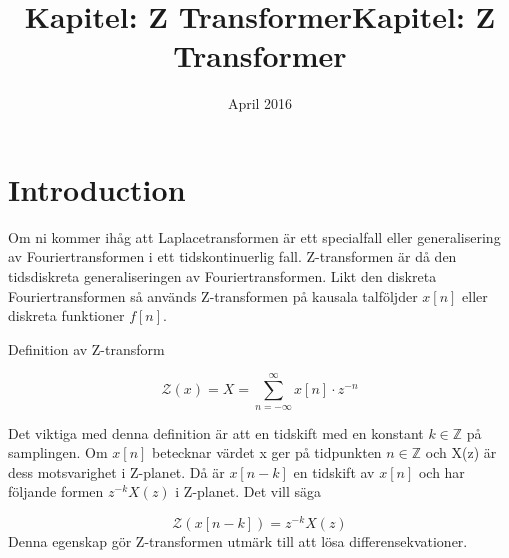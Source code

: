 \documentclass{article}
\title{Kapitel: Z Transformer}
\author{ }
\date{April 2016}
\title{Kapitel: Z Transformer}
\begin{document}
\maketitle

\section{Introduction}

Om ni kommer ihåg att Laplacetransformen är ett specialfall eller generalisering av Fouriertransformen i ett
tidskontinuerlig fall. Z-transformen är då den tidsdiskreta generaliseringen av Fouriertransformen.
Likt den diskreta Fouriertransformen så används Z-transformen på kausala talföljder $x[n]$ eller
diskreta funktioner $f[n]$. %

Definition av Z-transform

$$\mathcal{Z}(x) = X = \sum_{n=-\infty}^{\infty} x[n] \cdot z^{-n} $$

Det viktiga med denna definition är att en tidskift med en konstant $k \in \mathbb{Z}$ på samplingen. Om $x[n]$ betecknar värdet x ger på tidpunkten $n \in \mathbb{Z}$ och X(z) är dess motsvarighet i Z-planet. Då är $x[n-k]$ en tidskift av $x[n]$ och har följande formen $z^{-k} X(z)$ i  Z-planet. Det vill säga


$$\mathcal{Z}(x[n-k]) = z^{-k} X(z) $$
Denna egenskap gör Z-transformen utmärk till att lösa differensekvationer.


\appendix
\end{document}

